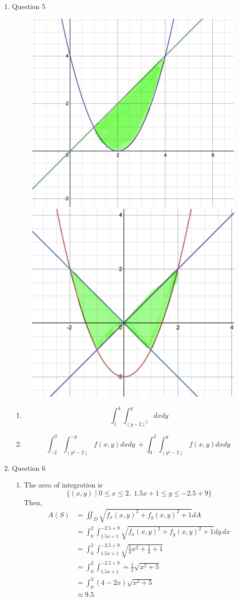 \documentclass[11pt]{article}
\begin{document}
\begin{enumerate}
    \item Question 5
    \begin{figure}[h]
        \centering
        \includegraphics[width=0.45\linewidth]{figures/test221.PNG}
        \includegraphics[width=0.45\linewidth]{figures/test222.PNG}
    \end{figure}
    \begin{enumerate}
        \item 
        $$
        \int_{1}^{4}\int_{\left(y-2\right)^{2}}^{y}dxdy
        $$
        
        \item
        $$
        \int_{-2}^{0}\int_{\left(y^{2}-2\right)}^{-y}f(x,y)dxdy\ +\int_{0}^{2}\int_{\left(y^{2}-2\right)}^{y}f(x,y)dxdy\ 
        $$
    \end{enumerate}
    
    \item Question 6
    \begin{enumerate}
        \item The area of integration is
        $$
        \{ (x,y) \mid 0 \leq x \leq 2,\; 1.5x+1 \leq y \leq -2.5+9 \}
        $$
        Then,
        $$
        \begin{aligned}
        A(S) &= \iint_D \sqrt{f_x(x,y)^2 + f_y(x,y)^2 + 1} dA \\
        &= \int_0^2 \int_{1.5x+1}^{-2.5+9} \sqrt{f_x(x,y)^2 + f_y(x,y)^2 + 1} dy \, dx \\
        &= \int_0^2 \int_{1.5x+1}^{-2.5+9} \sqrt{\frac{1}{4}x^2 + \frac{1}{4} + 1} \\
        &= \int_0^2 \int_{1.5x+1}^{-2.5+9} = \frac{1}{2}\sqrt{x^2+5} \\
        &= \int_0^2 (4-2x) \sqrt{x^2+5} \\
        &\approx 9.5
        \end{aligned}
        $$
        

\end{enumerate}
\end{enumerate}
\end{document}
